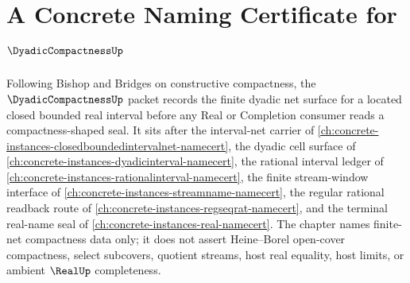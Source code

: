 \chapter{A Concrete Naming Certificate for $\DyadicCompactnessUp$}
\label{ch:concrete-instances-dyadic-compactness-namecert}

Following Bishop and Bridges on constructive compactness, the $\DyadicCompactnessUp$ packet records the finite dyadic net surface for a located closed bounded real interval before any Real or Completion consumer reads a compactness-shaped seal. It sits after the interval-net carrier of \autoref{ch:concrete-instances-closedboundedintervalnet-namecert}, the dyadic cell surface of \autoref{ch:concrete-instances-dyadicinterval-namecert}, the rational interval ledger of \autoref{ch:concrete-instances-rationalinterval-namecert}, the finite stream-window interface of \autoref{ch:concrete-instances-streamname-namecert}, the regular rational readback route of \autoref{ch:concrete-instances-regseqrat-namecert}, and the terminal real-name seal of \autoref{ch:concrete-instances-real-namecert}. The chapter names finite-net compactness data only; it does not assert Heine--Borel open-cover compactness, select subcovers, quotient streams, host real equality, host limits, or ambient $\RealUp$ completeness.

